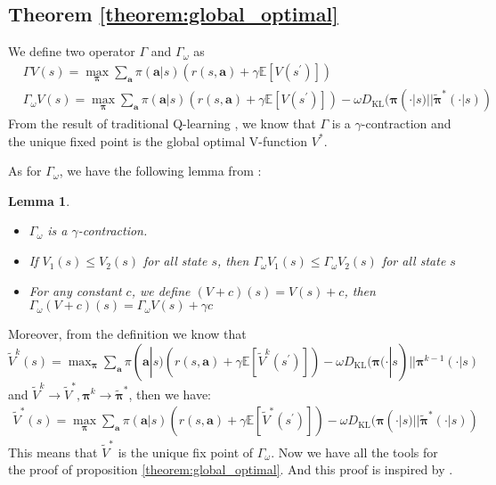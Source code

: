 \documentclass{article}
\newtheorem{lemma}{Lemma}
\begin{document}
		\subsection{Theorem \ref{theorem:global_optimal}}
	\label{app:global_optimal}
	We define two operator $\Gamma$ and $\Gamma_\omega$ as 
	\begin{align*}
	    &\Gamma V(s) = \max_{\bm{\pi}} \sum_{\bm{a}} \pi(\bm{a}|s) (r(s,\bm{a}) + \gamma \mathbb{E}[V(s^\prime)]) \\
	    & \Gamma_\omega V(s) = \max_{\bm{\pi}} \sum_{\bm{a}} \pi(\bm{a}|s) (r(s,\bm{a}) + \gamma \mathbb{E}[V(s^\prime)] ) - \omega D_{\operatorname{KL}}(\bm{\pi}(\cdot|s) || \tilde{\bm{\pi}}^*(\cdot|s) )  
	\end{align*}
	From the result of traditional Q-learning \citep{RLBOOK}, we know that $\Gamma$ is a $\gamma$-contraction and the unique fixed point is the global optimal V-function $V^*$. 
	
	As for $\Gamma_\omega$, we have the following lemma from \citet{regularizer}:
	\begin{lemma} \label{reg-lemma}
	\mbox{}\par
	    \begin{itemize}
	        \item[$(1)$] $\Gamma_\omega$ is a $\gamma$-contraction.
	        \item[$(2)$] If $V_1(s) \le V_2(s)$ for all state $s$, then $\Gamma_\omega V_1(s) \le \Gamma_\omega V_2(s)$ for all state $s$
	        \item[$(3)$] For any constant $c$, we define $(V+c)(s) = V(s) + c $, then $\Gamma_\omega (V+c)(s) = \Gamma_\omega V(s) + \gamma c$
	    \end{itemize}
	\end{lemma}
	Moreover, from the definition we know that $\tilde{V}^k(s) = \max_{\bm{\pi}} \sum_{\bm{a}} \pi(\bm{a}|s) (r(s,\bm{a}) + \gamma \mathbb{E}[\tilde{V}^k(s^\prime)] )- \omega D_{\operatorname{KL}}(\bm{\pi}(\cdot|s) || {\bm{\pi}}^{k - 1}(\cdot|s) $ and $\tilde{V}^k \to \tilde{V}^*,\bm{\pi}^{k} \to \tilde{\bm{\pi}}^*$, then we have:
	\begin{align*}
	    \tilde{V}^*(s) = \max_{\bm{\pi}} \sum_{\bm{a}} \pi(\bm{a}|s) (r(s,\bm{a}) + \gamma \mathbb{E}[\tilde{V}^*(s^\prime)]) - \omega D_{\operatorname{KL}}(\bm{\pi}(\cdot|s) || \tilde{\bm{\pi}}^*(\cdot|s) )  
	\end{align*}
	This means that $\tilde{V}^*$ is the unique fix point of $\Gamma_\omega$. Now we have all the tools for the proof of proposition \ref{theorem:global_optimal}. And this proof is inspired by \citet{regularizer}.
	
\end{document}
